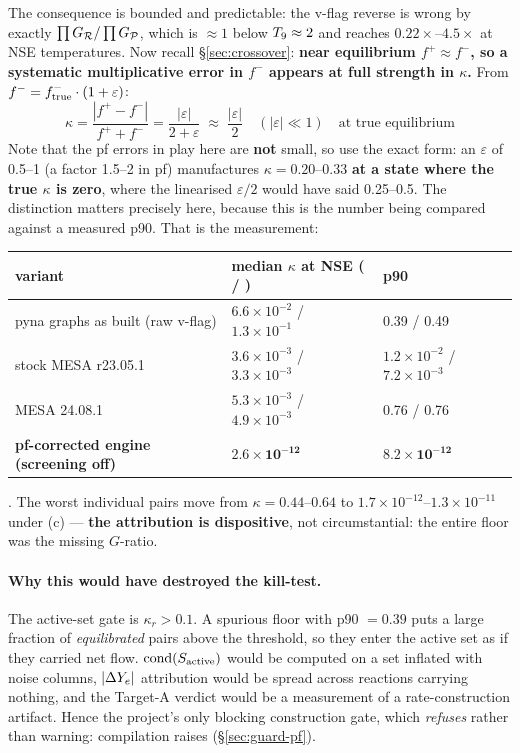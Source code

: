 The consequence is bounded and predictable: the v-flag reverse is wrong by
exactly $\prod G_{\mathcal{R}}/\prod G_{\mathcal{P}}$, which is ${\approx}1$ below
$T_{9} \approx 2$ and reaches $0.22\times$--$4.5\times$ at NSE temperatures. Now
recall \S\ref{sec:crossover}: \textbf{near equilibrium $f^+ \approx f^-$, so a
systematic multiplicative error in $f^-$ appears at full strength in $\kappa$.}
From $f^- = f^-_{\rm true}\cdot(1+\varepsilon)$:
%
\begin{equation*}
\kappa = \frac{|f^+-f^-|}{f^++f^-} = \frac{|\varepsilon|}{2+\varepsilon}
\;\approx\; \frac{|\varepsilon|}{2}\quad(|\varepsilon|\ll1)
\quad\text{at true equilibrium}
\end{equation*}
%
Note that the pf errors in play here are \textbf{not} small, so use the exact
form: an $\varepsilon$ of 0.5--1 (a factor 1.5--2 in pf) manufactures
$\kappa = \mathbf{0.20}$--$\mathbf{0.33}$ \textbf{at a state where the true
$\kappa$ is zero}, where the linearised $\varepsilon/2$ would have said
0.25--0.5. The distinction matters precisely here, because this is the number
being compared against a measured p90. That is the measurement:

\begin{center}
\begin{tabularx}{\textwidth}{@{}Y L{5.0cm} L{3.0cm}@{}}
\toprule
\textbf{variant} & \textbf{median $\kappa$ at NSE ( / )}
  & \textbf{p90} \\
\midrule
pyna graphs as built (raw v-flag) &
  $6.6\times10^{-2}$ / $1.3\times10^{-1}$ & 0.39 / 0.49 \\
stock MESA r23.05.1 &
  $3.6\times10^{-3}$ / $3.3\times10^{-3}$ &
  $1.2\times10^{-2}$ / $7.2\times10^{-3}$ \\
MESA 24.08.1 &
  $5.3\times10^{-3}$ / $4.9\times10^{-3}$ & 0.76 / 0.76 \\
\textbf{pf-corrected engine (screening off)} &
  $\mathbf{2.6\times10^{-12}}$ & $\mathbf{8.2\times10^{-12}}$ \\
\bottomrule
\end{tabularx}
\end{center}

. The worst individual pairs move from
$\kappa = 0.44$--$0.64$ to $1.7\times10^{-12}$--$1.3\times10^{-11}$ under (c)
--- \textbf{the attribution is dispositive}, not circumstantial: the entire
floor was the missing $G$-ratio.

\paragraph{Why this would have destroyed the kill-test.} The active-set gate is
$\kappa_r > 0.1$. A spurious floor with p90 $= 0.39$ puts a large fraction of
\emph{equilibrated} pairs above the threshold, so they enter the active set as
if they carried net flow. $\operatorname{cond}(S_{\rm active})$ would be computed on a set
inflated with noise columns, $|\Delta Y_{e}|$ attribution would be spread across
reactions carrying nothing, and the Target-A verdict would be a measurement of a
rate-construction artifact. Hence the project's only blocking construction gate,
which \emph{refuses} rather than warning: compilation raises
 (\S\ref{sec:guard-pf}).

